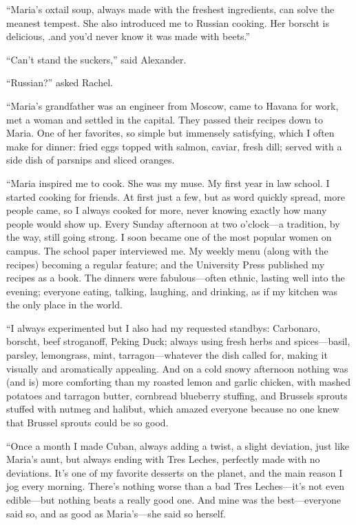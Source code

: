 ``Maria's oxtail soup, always made with the freshest ingredients, can
solve the meanest tempest. She also introduced me to Russian cooking.
Her borscht is delicious, .and you'd never know it was made with
beets.''

``Can't stand the suckers,'' said Alexander.

``Russian?'' asked Rachel.

``Maria's grandfather was an engineer from Moscow, came to Havana for
work, met a woman and settled in the capital. They passed their recipes
down to Maria. One of her favorites, so simple but immensely satisfying,
which I often make for dinner: fried eggs topped with salmon, caviar,
fresh dill; served with a side dish of parsnips and sliced oranges.

``Maria inspired me to cook. She was my muse. My first year in law
school. I started cooking for friends. At first just a few, but as word
quickly spread, more people came, so I always cooked for more, never
knowing exactly how many people would show up. Every Sunday afternoon at
two o'clock---a tradition, by the way, still going strong. I soon became
one of the most popular women on campus. The school paper interviewed
me. My weekly menu (along with the recipes) becoming a regular feature;
and the University Press published my recipes as a book. The dinners
were fabulous---often ethnic, lasting well into the evening; everyone
eating, talking, laughing, and drinking, as if my kitchen was the only
place in the world.

``I always experimented but I also had my requested standbys: Carbonaro,
borscht, beef stroganoff, Peking Duck; always using fresh herbs and
spices---basil, parsley, lemongrass, mint, tarragon---whatever the dish
called for, making it visually and aromatically appealing. And on a cold
snowy afternoon nothing was (and is) more comforting than my roasted
lemon and garlic chicken, with mashed potatoes and tarragon butter,
cornbread blueberry stuffing, and Brussels sprouts stuffed with nutmeg
and halibut, which amazed everyone because no one knew that Brussel
sprouts could be so good.

``Once a month I made Cuban, always adding a twist, a slight deviation,
just like Maria's aunt, but always ending with Tres Leches, perfectly
made with no deviations. It's one of my favorite desserts on the planet,
and the main reason I jog every morning. There's nothing worse than a
bad Tres Leches---it's not even edible---but nothing beats a really good
one. And mine was the best---everyone said so, and as good as
Maria's---she said so herself.

